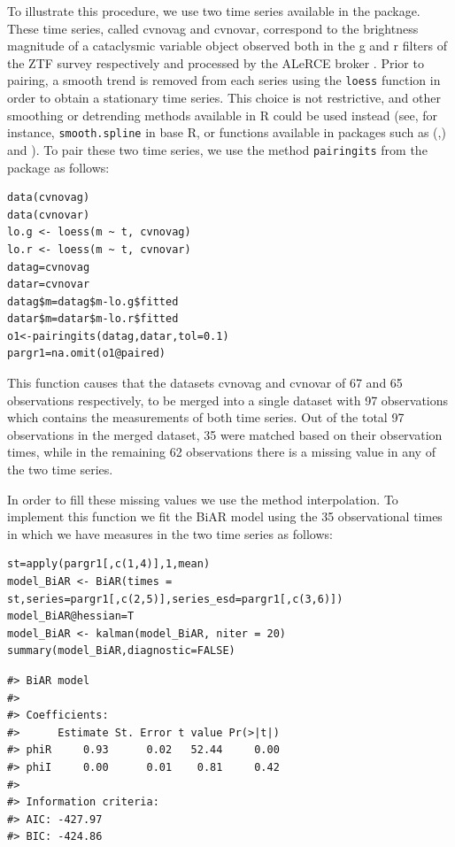 To illustrate this procedure, we use two time series available in the  package. These time series, called cvnovag and cvnovar, correspond to the brightness magnitude of a cataclysmic variable object observed both in the g and r filters of the ZTF survey respectively and processed by the ALeRCE broker \citep{Forster_2021}. Prior to pairing, a smooth trend is removed from each series using the \texttt{loess} function in order to obtain a stationary time series. This choice is not restrictive, and other smoothing or detrending methods available in R could be used instead (see, for instance, \texttt{smooth.spline} in base R, or functions available in packages such as  (\citet{Wood2001},\citet{Wood2017}) and  \citep{HyndmanKhandakar2008}). To pair these two time series, we use the method \texttt{pairingits} from the  package as follows:

\begin{verbatim}
data(cvnovag)
data(cvnovar)
lo.g <- loess(m ~ t, cvnovag)
lo.r <- loess(m ~ t, cvnovar)
datag=cvnovag
datar=cvnovar
datag$m=datag$m-lo.g$fitted
datar$m=datar$m-lo.r$fitted
o1<-pairingits(datag,datar,tol=0.1)
pargr1=na.omit(o1@paired)
\end{verbatim}

This function causes that the datasets cvnovag and cvnovar of 67 and 65 observations respectively, to be merged into a single dataset with 97 observations which contains the measurements of both time series. Out of the total 97 observations in the merged dataset, 35 were matched based on their observation times, while in the remaining 62 observations there is a missing value in any of the two time series.

In order to fill these missing values we use the method interpolation. To implement this function we fit the BiAR model using the 35 observational times in which we have measures in the two time series as follows:

\begin{verbatim}
st=apply(pargr1[,c(1,4)],1,mean)
model_BiAR <- BiAR(times = st,series=pargr1[,c(2,5)],series_esd=pargr1[,c(3,6)])
model_BiAR@hessian=T
model_BiAR <- kalman(model_BiAR, niter = 20)
summary(model_BiAR,diagnostic=FALSE)
\end{verbatim}

\begin{verbatim}
#> BiAR model
#> 
#> Coefficients:
#>      Estimate St. Error t value Pr(>|t|)
#> phiR     0.93      0.02   52.44     0.00
#> phiI     0.00      0.01    0.81     0.42
#> 
#> Information criteria:
#> AIC: -427.97 
#> BIC: -424.86
\end{verbatim}


